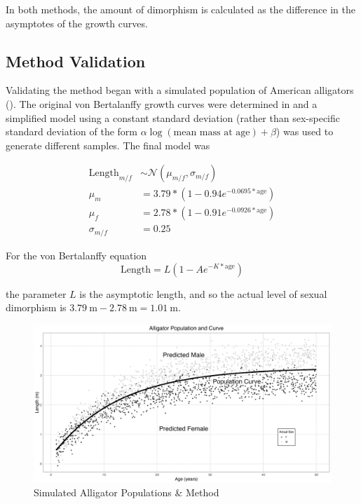 \documentclass[letterpaper]{article}
\begin{document}
In both methods, the amount of dimorphism is calculated as the difference in the asymptotes of the growth curves.

\subsection{Method Validation}

Validating the method began with a simulated population of American alligators (). The original von Bertalanffy growth curves were determined in \cite{wilkinsonGrowthRatesAmerican1997} and a simplified model using a constant standard deviation (rather than sex-specific standard deviation of the form $\alpha \log(\text{mean mass at age}) + \beta$) was used to generate different samples. The final model was

\begin{align*}
\text{Length}_{ m / f } &\sim \mathcal{N}\left(\mu_{ m / f }, \sigma_{m/f}\right) \\
\mu_m &= 3.79 * \left(1 - 0.94e^{-0.0695 \ast \text{age}}\right) \\
\mu_f &= 2.78 * \left(1 - 0.91e^{-0.0926 \ast \text{age}}\right) \\
\sigma_{m/f} &= 0.25
\end{align*}

For the von Bertalanffy equation
$$
\text{Length} = L(1 - Ae^{-K \ast \text{age}})
$$

the parameter $L$ is the asymptotic length, and so the actual level of sexual dimorphism is $\SI{3.79}{\m} - \SI{2.78}{\m} = \SI{1.01}{\m}$.

\begin{figure}
	\centering
	\includegraphics[width = \textwidth]{images/alligatorMethod.png}
	\caption{Simulated Alligator Populations \& Method}
	\label{fig:alligatorSim}
\end{figure}
\end{document}
